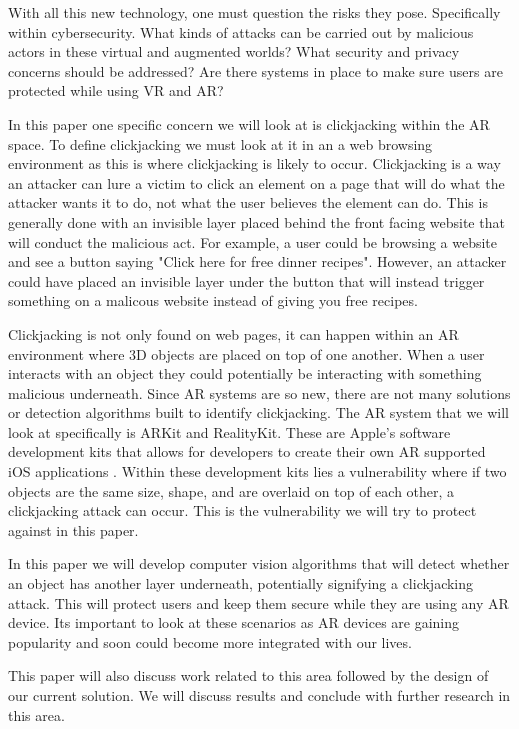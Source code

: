 \documentclass[conference]{IEEEtran}
\begin{document}
With all this new technology, one must question the risks they pose. Specifically within cybersecurity. What kinds of attacks can be carried out by malicious actors in these virtual and augmented worlds? What security and privacy concerns should be addressed? Are there systems in place to make sure users are protected while using VR and AR? 

In this paper one specific concern we will look at is clickjacking within the AR space. To define clickjacking we must look at it in an a web browsing environment as this is where clickjacking is likely to occur. Clickjacking is a way an attacker can lure a victim to click an element on a page that will do what the attacker wants it to do, not what the user believes the element can do\cite{balduzzi_solution_2010}. This is generally done with an invisible layer placed behind the front facing website that will conduct the malicious act. For example, a user could be browsing a website and see a button saying "Click here for free dinner recipes". However, an attacker could have placed an invisible layer under the button that will instead trigger something on a malicous website instead of giving you free recipes. 

Clickjacking is not only found on web pages, it can happen within an AR environment where 3D objects are placed on top of one another. When a user interacts with an object they could potentially be interacting with something malicious underneath. Since AR systems are so new, there are not many solutions or detection algorithms built to identify clickjacking. The AR system that we will look at specifically is ARKit and RealityKit. These are Apple's software development kits that allows for developers to create their own AR supported iOS applications \cite{inc_augmented_nodate}. Within these development kits lies a vulnerability where if two objects are the same size, shape, and are overlaid on top of each other, a clickjacking attack can occur. This is the vulnerability we will try to protect against in this paper.

In this paper we will develop computer vision algorithms that will detect whether an object has another layer underneath, potentially signifying a clickjacking attack. This will protect users and keep them secure while they are using any AR device. Its important to look at these scenarios as AR devices are gaining popularity and soon could become more integrated with our lives. 

This paper will also discuss work related to this area followed by the design of our current solution. We will discuss results and conclude with further research in this area. 
\end{document}

